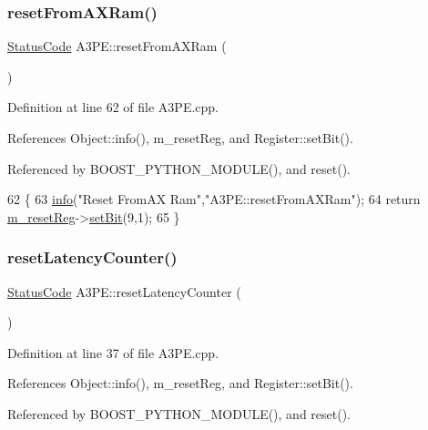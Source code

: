 \subsubsection{\texorpdfstring{reset\+From\+A\+X\+Ram()}{resetFromAXRam()}}
{\footnotesize\ttfamily \hyperlink{classStatusCode}{Status\+Code} A3\+P\+E\+::reset\+From\+A\+X\+Ram (\begin{DoxyParamCaption}{ }\end{DoxyParamCaption})}



Definition at line 62 of file A3\+P\+E.\+cpp.



References Object\+::info(), m\+\_\+reset\+Reg, and Register\+::set\+Bit().



Referenced by B\+O\+O\+S\+T\+\_\+\+P\+Y\+T\+H\+O\+N\+\_\+\+M\+O\+D\+U\+L\+E(), and reset().


\begin{DoxyCode}
62                                \{
63   \hyperlink{classObject_a644fd329ea4cb85f54fa6846484b84a8}{info}(\textcolor{stringliteral}{"Reset FromAX Ram"},\textcolor{stringliteral}{"A3PE::resetFromAXRam"});
64   \textcolor{keywordflow}{return} \hyperlink{classA3PE_ab4db5f00976e5095686f108c8febf702}{m\_resetReg}->\hyperlink{classRegister_ab094246dd12aa7e0aa0ca917f4e70b31}{setBit}(9,1);
65 \}
\end{DoxyCode}
\mbox{\label{classA3PE_a44c50d822ac4f5d8f2b8ed75c5b90580}} 
\subsubsection{\texorpdfstring{reset\+Latency\+Counter()}{resetLatencyCounter()}}
{\footnotesize\ttfamily \hyperlink{classStatusCode}{Status\+Code} A3\+P\+E\+::reset\+Latency\+Counter (\begin{DoxyParamCaption}{ }\end{DoxyParamCaption})}



Definition at line 37 of file A3\+P\+E.\+cpp.



References Object\+::info(), m\+\_\+reset\+Reg, and Register\+::set\+Bit().



Referenced by B\+O\+O\+S\+T\+\_\+\+P\+Y\+T\+H\+O\+N\+\_\+\+M\+O\+D\+U\+L\+E(), and reset().


